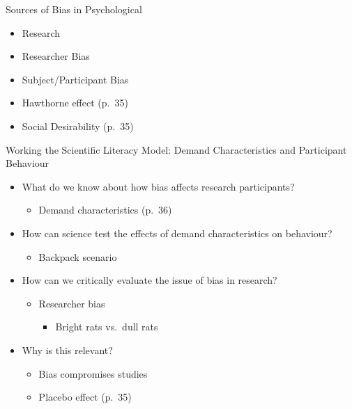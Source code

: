 \documentclass[
]{book}
\providecommand{\tightlist}{%
  \setlength{\itemsep}{0pt}\setlength{\parskip}{0pt}}
\begin{document}
\begin{reflect}
Sources of Bias in Psychological

\begin{itemize}
\tightlist
\item
  Research\\
\item
  Researcher Bias\\
\item
  Subject/Participant Bias\\
\item
  Hawthorne effect (p.~35)\\
\item
  Social Desirability (p.~35)
\end{itemize}

Working the Scientific Literacy Model: Demand Characteristics and
Participant Behaviour

\begin{itemize}
\tightlist
\item
  What do we know about how bias affects research participants?

  \begin{itemize}
  \tightlist
  \item
    Demand characteristics (p.~36)\\
  \end{itemize}
\item
  How can science test the effects of demand characteristics on behaviour?

  \begin{itemize}
  \tightlist
  \item
    Backpack scenario\\
  \end{itemize}
\item
  How can we critically evaluate the issue of bias in research?

  \begin{itemize}
  \tightlist
  \item
    Researcher bias

    \begin{itemize}
    \tightlist
    \item
      Bright rats vs.~dull rats\\
    \end{itemize}
  \end{itemize}
\item
  Why is this relevant?

  \begin{itemize}
  \tightlist
  \item
    Bias compromises studies\\
  \item
    Placebo effect (p.~35)
  \end{itemize}
\end{itemize}


\end{reflect}
\end{document}
